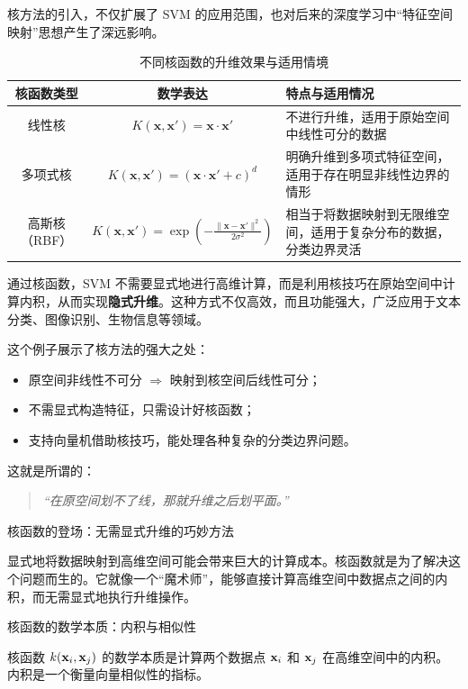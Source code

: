 {核方法的引入，不仅扩展了 SVM 的应用范围，也对后来的深度学习中“特征空间映射”思想产生了深远影响。
\begin{table}[htbp]
\centering
\caption{不同核函数的升维效果与适用情境}
\begin{tabular}{|c|c|p{7cm}|}
\hline
\textbf{核函数类型} & \textbf{数学表达} & \textbf{特点与适用情况} \\
\hline
线性核 & \( K(\mathbf{x}, \mathbf{x}') = \mathbf{x} \cdot \mathbf{x}' \) & 不进行升维，适用于原始空间中线性可分的数据 \\
\hline
多项式核 & \( K(\mathbf{x}, \mathbf{x}') = (\mathbf{x} \cdot \mathbf{x}' + c)^d \) & 明确升维到多项式特征空间，适用于存在明显非线性边界的情形 \\
\hline
高斯核（RBF） & \( K(\mathbf{x}, \mathbf{x}') = \exp\left(-\frac{\|\mathbf{x} - \mathbf{x}'\|^2}{2\sigma^2}\right) \) & 相当于将数据映射到无限维空间，适用于复杂分布的数据，分类边界灵活 \\
\hline
\end{tabular}
\label{tab:kernel_comparison}
\end{table}


通过核函数，SVM 不需要显式地进行高维计算，而是利用核技巧在原始空间中计算内积，从而实现\textbf{隐式升维}。这种方式不仅高效，而且功能强大，广泛应用于文本分类、图像识别、生物信息等领域。

这个例子展示了核方法的强大之处：
\begin{itemize}
    \item 原空间非线性不可分 $\Rightarrow$ 映射到核空间后线性可分；
    \item 不需显式构造特征，只需设计好核函数；
    \item 支持向量机借助核技巧，能处理各种复杂的分类边界问题。
\end{itemize}

这就是所谓的：
\begin{quote}
\itshape
“在原空间划不了线，那就升维之后划平面。”
\end{quote}


 
 核函数的登场：无需显式升维的巧妙方法

显式地将数据映射到高维空间可能会带来巨大的计算成本。核函数就是为了解决这个问题而生的。它就像一个“魔术师”，能够直接计算高维空间中数据点之间的内积，而无需显式地执行升维操作。

 核函数的数学本质：内积与相似性

核函数 $k({\bf x}_i, {\bf x}_j)$ 的数学本质是计算两个数据点 ${\bf x}_i$ 和 ${\bf x}_j$ 在高维空间中的内积。内积是一个衡量向量相似性的指标。

}
